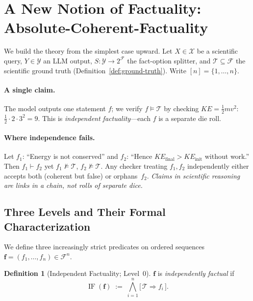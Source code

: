 \documentclass{uai2026} %
\theoremstyle{remark}
\theoremstyle{plain}
\theoremstyle{definition}
\newtheorem{definition}[theorem]{Definition}
\begin{document}
\section{A New Notion of Factuality: Absolute-Coherent-Factuality}

We build the theory from the simplest case upward.
Let $X\!\in\!\mathcal{X}$ be a scientific query,
$Y\!\in\!\mathcal{Y}$ an LLM output,
$S:\mathcal{Y}\!\to\!2^{\mathcal{F}}$ the fact-option
splitter, and $\mathcal{T}\!\subseteq\!\mathcal{F}$ the
scientific ground truth
(Definition~\ref{def:ground-truth}).
Write $[n]=\{1,\dots,n\}$.

\paragraph{A single claim.}
The model outputs one statement $f$; we verify
$f\models\mathcal{T}$ by checking
$KE=\tfrac{1}{2}mv^{2}$:
$\tfrac{1}{2}\!\cdot\!2\!\cdot\!3^{2}=9$.
This is \emph{independent factuality}---each $f$ is a
separate die roll.

\paragraph{Where independence fails.}
Let $f_{1}$: ``Energy is not conserved'' and
$f_{2}$: ``Hence $KE_{\text{final}}>KE_{\text{init}}$
without work.''
Then $f_{1}\vdash f_{2}$ yet
$f_{1}\not\models\mathcal{T}$,
$f_{2}\not\models\mathcal{T}$.
Any checker treating $f_{1},f_{2}$ independently either
accepts both (coherent but false) or orphans~$f_{2}$.
\emph{Claims in scientific reasoning are links in a chain,
not rolls of separate dice.}

\subsection{Three Levels and Their Formal Characterization}

We define three increasingly strict predicates on ordered
sequences $\bm{f}=(f_{1},\dots,f_{n})\in\mathcal{F}^{n}$.

\begin{definition}[Independent Factuality; Level~0]
\label{def:indep-fact}
$\bm{f}$ is \emph{independently factual} if
\begin{equation}\label{eq:level0}
  \operatorname{IF}(\bm{f})
  \;:=\;
  \bigwedge_{i=1}^{n}
  \bigl[\,\mathcal{T}\Rightarrow f_{i}\,\bigr].
\end{equation}
\end{definition}
\end{document}
